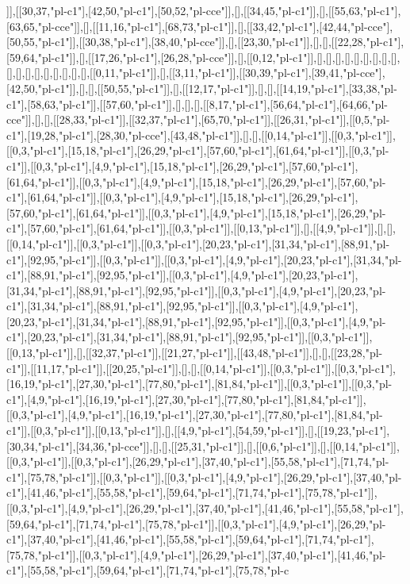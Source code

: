 ]],[[30,37,"pl-c1"],[42,50,"pl-c1"],[50,52,"pl-cce"]],[],[[34,45,"pl-c1"]],[],[[55,63,"pl-c1"],[63,65,"pl-cce"]],[],[[11,16,"pl-c1"],[68,73,"pl-c1"]],[],[[33,42,"pl-c1"],[42,44,"pl-cce"],[50,55,"pl-c1"]],[[30,38,"pl-c1"],[38,40,"pl-cce"]],[],[[23,30,"pl-c1"]],[],[],[[22,28,"pl-c1"],[59,64,"pl-c1"]],[],[[17,26,"pl-c1"],[26,28,"pl-cce"]],[],[[0,12,"pl-c1"]],[],[],[],[],[],[],[],[],[],[],[],[],[],[],[],[],[],[],[[0,11,"pl-c1"]],[],[[3,11,"pl-c1"]],[[30,39,"pl-c1"],[39,41,"pl-cce"],[42,50,"pl-c1"]],[],[],[[50,55,"pl-c1"]],[],[[12,17,"pl-c1"]],[],[],[[14,19,"pl-c1"],[33,38,"pl-c1"],[58,63,"pl-c1"]],[[57,60,"pl-c1"]],[],[],[],[[8,17,"pl-c1"],[56,64,"pl-c1"],[64,66,"pl-cce"]],[],[],[[28,33,"pl-c1"]],[[32,37,"pl-c1"],[65,70,"pl-c1"]],[[26,31,"pl-c1"]],[[0,5,"pl-c1"],[19,28,"pl-c1"],[28,30,"pl-cce"],[43,48,"pl-c1"]],[],[],[[0,14,"pl-c1"]],[[0,3,"pl-c1"]],[[0,3,"pl-c1"],[15,18,"pl-c1"],[26,29,"pl-c1"],[57,60,"pl-c1"],[61,64,"pl-c1"]],[[0,3,"pl-c1"]],[[0,3,"pl-c1"],[4,9,"pl-c1"],[15,18,"pl-c1"],[26,29,"pl-c1"],[57,60,"pl-c1"],[61,64,"pl-c1"]],[[0,3,"pl-c1"],[4,9,"pl-c1"],[15,18,"pl-c1"],[26,29,"pl-c1"],[57,60,"pl-c1"],[61,64,"pl-c1"]],[[0,3,"pl-c1"],[4,9,"pl-c1"],[15,18,"pl-c1"],[26,29,"pl-c1"],[57,60,"pl-c1"],[61,64,"pl-c1"]],[[0,3,"pl-c1"],[4,9,"pl-c1"],[15,18,"pl-c1"],[26,29,"pl-c1"],[57,60,"pl-c1"],[61,64,"pl-c1"]],[[0,3,"pl-c1"]],[[0,13,"pl-c1"]],[],[[4,9,"pl-c1"]],[],[],[[0,14,"pl-c1"]],[[0,3,"pl-c1"]],[[0,3,"pl-c1"],[20,23,"pl-c1"],[31,34,"pl-c1"],[88,91,"pl-c1"],[92,95,"pl-c1"]],[[0,3,"pl-c1"]],[[0,3,"pl-c1"],[4,9,"pl-c1"],[20,23,"pl-c1"],[31,34,"pl-c1"],[88,91,"pl-c1"],[92,95,"pl-c1"]],[[0,3,"pl-c1"],[4,9,"pl-c1"],[20,23,"pl-c1"],[31,34,"pl-c1"],[88,91,"pl-c1"],[92,95,"pl-c1"]],[[0,3,"pl-c1"],[4,9,"pl-c1"],[20,23,"pl-c1"],[31,34,"pl-c1"],[88,91,"pl-c1"],[92,95,"pl-c1"]],[[0,3,"pl-c1"],[4,9,"pl-c1"],[20,23,"pl-c1"],[31,34,"pl-c1"],[88,91,"pl-c1"],[92,95,"pl-c1"]],[[0,3,"pl-c1"],[4,9,"pl-c1"],[20,23,"pl-c1"],[31,34,"pl-c1"],[88,91,"pl-c1"],[92,95,"pl-c1"]],[[0,3,"pl-c1"]],[[0,13,"pl-c1"]],[],[[32,37,"pl-c1"]],[[21,27,"pl-c1"]],[[43,48,"pl-c1"]],[],[],[[23,28,"pl-c1"]],[[11,17,"pl-c1"]],[[20,25,"pl-c1"]],[],[],[[0,14,"pl-c1"]],[[0,3,"pl-c1"]],[[0,3,"pl-c1"],[16,19,"pl-c1"],[27,30,"pl-c1"],[77,80,"pl-c1"],[81,84,"pl-c1"]],[[0,3,"pl-c1"]],[[0,3,"pl-c1"],[4,9,"pl-c1"],[16,19,"pl-c1"],[27,30,"pl-c1"],[77,80,"pl-c1"],[81,84,"pl-c1"]],[[0,3,"pl-c1"],[4,9,"pl-c1"],[16,19,"pl-c1"],[27,30,"pl-c1"],[77,80,"pl-c1"],[81,84,"pl-c1"]],[[0,3,"pl-c1"]],[[0,13,"pl-c1"]],[],[[4,9,"pl-c1"],[54,59,"pl-c1"]],[],[[19,23,"pl-c1"],[30,34,"pl-c1"],[34,36,"pl-cce"]],[],[],[[25,31,"pl-c1"]],[],[[0,6,"pl-c1"]],[],[[0,14,"pl-c1"]],[[0,3,"pl-c1"]],[[0,3,"pl-c1"],[26,29,"pl-c1"],[37,40,"pl-c1"],[55,58,"pl-c1"],[71,74,"pl-c1"],[75,78,"pl-c1"]],[[0,3,"pl-c1"]],[[0,3,"pl-c1"],[4,9,"pl-c1"],[26,29,"pl-c1"],[37,40,"pl-c1"],[41,46,"pl-c1"],[55,58,"pl-c1"],[59,64,"pl-c1"],[71,74,"pl-c1"],[75,78,"pl-c1"]],[[0,3,"pl-c1"],[4,9,"pl-c1"],[26,29,"pl-c1"],[37,40,"pl-c1"],[41,46,"pl-c1"],[55,58,"pl-c1"],[59,64,"pl-c1"],[71,74,"pl-c1"],[75,78,"pl-c1"]],[[0,3,"pl-c1"],[4,9,"pl-c1"],[26,29,"pl-c1"],[37,40,"pl-c1"],[41,46,"pl-c1"],[55,58,"pl-c1"],[59,64,"pl-c1"],[71,74,"pl-c1"],[75,78,"pl-c1"]],[[0,3,"pl-c1"],[4,9,"pl-c1"],[26,29,"pl-c1"],[37,40,"pl-c1"],[41,46,"pl-c1"],[55,58,"pl-c1"],[59,64,"pl-c1"],[71,74,"pl-c1"],[75,78,"pl-c